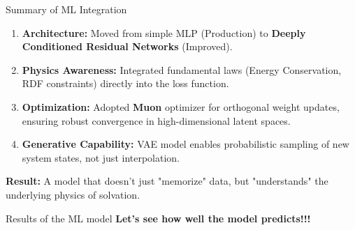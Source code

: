 \documentclass[aspectratio=169, 10pt]{beamer}
\begin{document}
\begin{frame}{Summary of ML Integration}
    \begin{enumerate}
        \item \textbf{Architecture:} Moved from simple MLP (Production) to \textbf{Deeply Conditioned Residual Networks} (Improved).
        \item \textbf{Physics Awareness:} Integrated fundamental laws (Energy Conservation, RDF constraints) directly into the loss function.
        \item \textbf{Optimization:} Adopted \textbf{Muon} optimizer for orthogonal weight updates, ensuring robust convergence in high-dimensional latent spaces.
        \item \textbf{Generative Capability:} VAE model enables probabilistic sampling of new system states, not just interpolation.
    \end{enumerate}

    \vspace{0.5cm}
    \centering
    \textbf{Result:} A model that doesn't just "memorize" data, but "understands" the underlying physics of solvation.
\end{frame}



\begin{frame}{Results of the ML model}
\centering
\Huge
\textbf{Let's see how well the model predicts!!!}
    
\end{frame}
\end{document}
